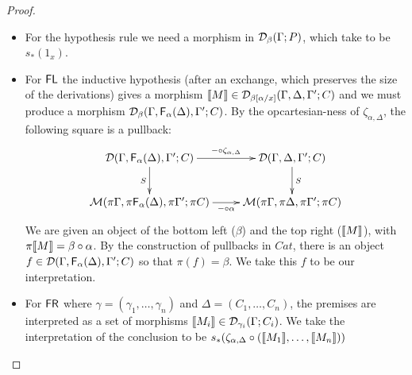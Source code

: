 \begin{proof}
\begin{itemize}
\item For the hypothesis rule
we need a morphism in $\mathcal{D}_\beta(\Gamma; P)$, which take to be $s_*(1_x)$.
\item For $\mathsf{FL}$
the inductive hypothesis (after an exchange, which preserves the size of
the derivations) gives a morphism $\llbracket M \rrbracket \in \mathcal{D}_{\beta[\alpha/x]}(\Gamma, \Delta, \Gamma'; C)$ and we must produce a morphism
$\mathcal{D}_{\beta}(\Gamma, \mathsf{F}_{\alpha}(\Delta),\Gamma'; C)$. By the
opcartesian-ness of $\zeta_{\alpha, \Delta}$, the following square is a
pullback:
\[ \xymatrix{
    \D(\Gamma,\F{\alpha}{\Delta},\Gamma';C) \ar[r]^-{-\circ \zeta_{\alpha, \Delta}} \ar[d]_S &
    \D(\Gamma,\Delta,\Gamma';C) \ar[d]^S \\
    \M(\pi\Gamma,\pi \F{\alpha}{\Delta}, \pi\Gamma'; \pi C) \ar[r]_-{-\circ \alpha} &
    \M(\pi\Gamma,\pi\Delta,\pi\Gamma'; \pi C)
}\]
We are given an object of the bottom left ($\beta$) and the top right
($\llbracket M \rrbracket$), with $\pi\llbracket M \rrbracket = \beta \circ \alpha$. By the
construction of pullbacks in $Cat$, there is an object $f \in
\mathcal{D}(\Gamma,\mathsf{F}_{\alpha}(\Delta),\Gamma';C)$ so that $\pi(f) = \beta$. We take
this $f$ to be our interpretation.

\item For $\mathsf{FR}$
where $\gamma = (\gamma_1, \dots, \gamma_n)$ and $\Delta = (C_1, \dots, C_n)$, the premises are interpreted as a set of morphisms $\llbracket M_i \rrbracket \in \mathcal{D}_{\gamma_i}(\Gamma; C_i)$. We take the interpretation of the conclusion to be $s_*(\zeta_{\alpha, \Delta} \circ (\llbracket M_1 \rrbracket, \dots, \llbracket M_n \rrbracket))$


\end{itemize}
\end{proof}
